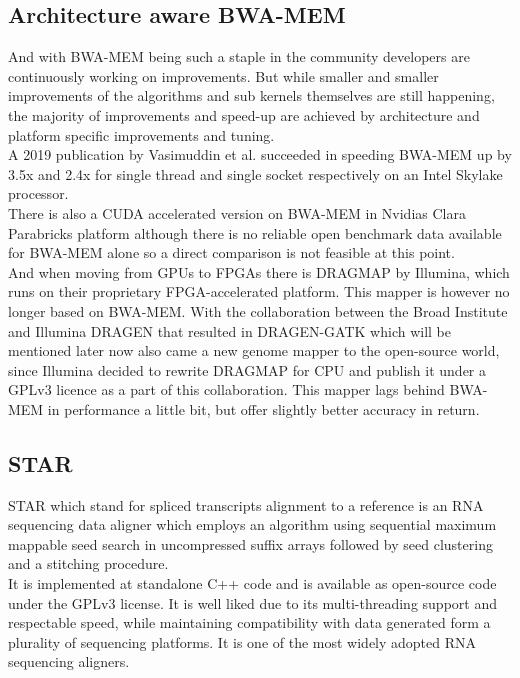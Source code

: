 \documentclass[conference]{IEEEtran}
\begin{document}
\subsection{Architecture aware BWA-MEM }
And with BWA-MEM being such a staple in the community developers are continuously working on improvements. But while smaller and smaller improvements of the algorithms and sub kernels themselves are still happening, the majority of improvements and speed-up are achieved by architecture and platform specific improvements and tuning. \\
A 2019 publication by Vasimuddin et al. succeeded in speeding BWA-MEM up by 3.5x and 2.4x for single thread and single socket respectively on an Intel Skylake processor.\\
There is also a CUDA accelerated version on BWA-MEM in Nvidias Clara Parabricks platform although there is no reliable open benchmark data available for BWA-MEM alone so a direct comparison is not feasible at this point. \\
And when moving from GPUs to FPGAs there is DRAGMAP by Illumina, which runs on their proprietary FPGA-accelerated platform. This mapper is however no longer based on BWA-MEM. With the collaboration between the Broad Institute and Illumina DRAGEN that resulted in DRAGEN-GATK which will be mentioned later now also came a new genome mapper to the open-source world, since Illumina decided to rewrite DRAGMAP for CPU and publish it under a GPLv3 licence as a part of this collaboration. This mapper lags behind BWA-MEM in performance a little bit, but offer slightly better accuracy in return. \\


\subsection{STAR}
STAR which stand for spliced transcripts alignment to a reference is an RNA sequencing data aligner which employs an algorithm using sequential maximum mappable seed search in uncompressed suffix arrays followed by seed clustering and a stitching procedure. \\
It is implemented at standalone C++ code and is available as open-source code under the GPLv3 license. It is well liked due to its multi-threading support and respectable speed, while maintaining compatibility with data generated form a plurality of sequencing platforms. It is one of the most widely adopted RNA sequencing aligners\cite{dobin_star_2013}. \\
\end{document}
